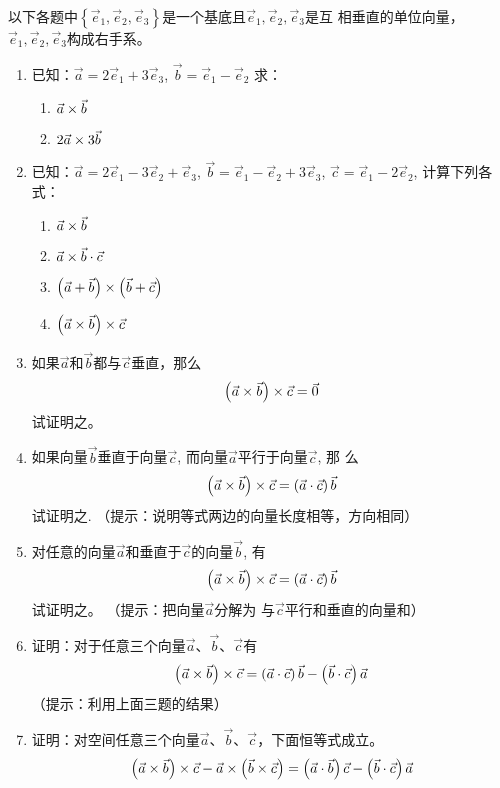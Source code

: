 \begin{ex}
以下各题中$\left\{\vec{e}_1,\vec{e}_2,\vec{e}_3\right\}$是一个基底且$\vec{e}_1,\vec{e}_2,\vec{e}_3$是互
相垂直的单位向量，$\vec{e}_1,\vec{e}_2,\vec{e}_3$构成右手系。
\begin{enumerate}
    \item 已知：$\vec{a}=2\vec{e}_1+3\vec{e}_3$, $\vec{b}=\vec{e}_1-\vec{e}_2$
    求：
\begin{multicols}{2}
\begin{enumerate}
    \item $\vec{a}\times \vec{b}$
    \item $2\vec{a}\times 3\vec{b}$
\end{enumerate}
\end{multicols}
    
\item 已知：$\vec{a}=2\vec{e}_1-3\vec{e}_2+\vec{e}_3$, $\vec{b}=\vec{e}_1-\vec{e}_2+3\vec{e}_3$, 
    $\vec{c}=\vec{e}_1-2\vec{e}_2$, 计算下列各式：
\begin{multicols}{2}
\begin{enumerate}
    \item $\vec{a}\times \vec{b}$
    \item $\vec{a}\times \vec{b}\cdot \vec{c}$
    \item $\left(\vec{a}+\vec{b}\right)\times \left(\vec{b}+\vec{c}\right)$
    \item $\left(\vec{a}\times \vec{b}\right)\times \vec{c}$
\end{enumerate}
\end{multicols}
\item 如果$\vec{a}$和$\vec{b}$都与$\vec{c}$垂直，那么
\[\left(\vec{a}\times \vec{b}\right)\times\vec{c}=\vec{0}\]
    试证明之。
    \item 如果向量$\vec{b}$垂直于向量$\vec{c}$, 而向量$\vec{a}$平行于向量$\vec{c}$, 那
    么
\[\left(\vec{a}\times \vec{b}\right)\times\vec{c}=\left(\vec{a}\cdot\vec{c}\right)\vec{b}\]
    试证明之. 
    （提示：说明等式两边的向量长度相等，方向相同）
    \item 对任意的向量$\vec{a}$和垂直于$\vec{c}$的向量$\vec{b}$, 有
    \[\left(\vec{a}\times \vec{b}\right)\times\vec{c}=\left(\vec{a}\cdot\vec{c}\right)\vec{b}\]
    试证明之。
    （提示：把向量$\vec{a}$分解为   
    与$\vec{c}$平行和垂直的向量和）
    
    \item 证明：对于任意三个向量$\vec{a}$、$\vec{b}$、$\vec{c}$有
    \[\left(\vec{a}\times \vec{b}\right)\times\vec{c}=\left(\vec{a}\cdot\vec{c}\right)\vec{b}-\left(\vec{b}\cdot\vec{c}\right)\vec{a}\]
    （提示：利用上面三题的结果）
    
    \item 证明：对空间任意三个向量$\vec{a}$、$\vec{b}$、$\vec{c}$，下面恒等式成立。
    \[\left(\vec{a}\times \vec{b}\right)\times\vec{c}-\vec{a}\times\left(\vec{b}\times \vec{c}\right)=\left(\vec{a}\cdot\vec{b}\right)\vec{c}-\left(\vec{b}\cdot\vec{c}\right)\vec{a}\]
\end{enumerate}
\end{ex}

